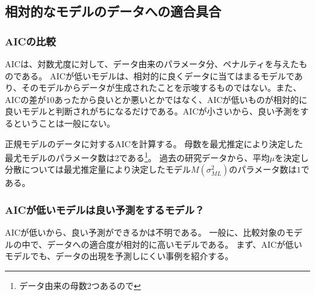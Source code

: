 \subsection{相対的なモデルのデータへの適合具合}
\subsubsection{AICの比較}
AICは、対数尤度に対して、データ由来のパラメータ分、ペナルティを与えたものである。
AICが低いモデルは、相対的に良くデータに当てはまるモデルであり、そのモデルからデータが生成されたことを示唆するものではない。また、AICの差が$10$あったから良いとか悪いとかではなく、AICが低いものが相対的に良いモデルと判断されがちになるだけである。AICが小さいから、良い予測をするということは一般にない。

正規モデルのデータに対するAICを計算する。
母数を最尤推定により決定した最尤モデルのパラメータ数は2である\footnote{データ由来の母数2つあるので}。
過去の研究データから、平均$\mu$を決定し分散については最尤推定量により決定したモデル$M(\sigma^2_{ML})$のパラメータ数は$1$である。

\subsubsection{AICが低いモデルは良い予測をするモデル？}
AICが低いから、良い予測ができるかは不明である。
一般に、比較対象のモデルの中で、データへの適合度が相対的に高いモデルである。
まず、AICが低いモデルでも、データの出現を予測しにくい事例を紹介する。




